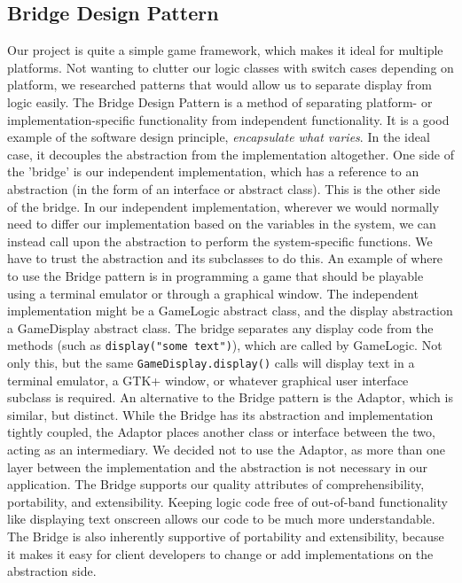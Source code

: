 \documentclass[11pt]{report}
\begin{document}
	\subsection{Bridge Design Pattern}
	Our project is quite a simple game framework, which makes it ideal for multiple platforms. Not wanting to clutter our logic classes with switch cases depending on platform, we researched patterns that would allow us to separate display from logic easily. The Bridge Design Pattern is a method of separating platform- or implementation-specific functionality from independent functionality. It is a good example of the software design principle, \emph{encapsulate what varies}. In the ideal case, it decouples the abstraction from the implementation altogether. One side of the 'bridge' is our independent implementation, which has a reference to an abstraction (in the form of an interface or abstract class). This is the other side of the bridge. In our independent implementation, wherever we would normally need to differ our implementation based on the variables in the system, we can instead call upon the abstraction to perform the system-specific functions. We have to trust the abstraction and its subclasses to do this. An example of where to use the Bridge pattern is in programming a game that should be playable using a terminal emulator or through a graphical window. The independent implementation might be a GameLogic abstract class, and the display abstraction a GameDisplay abstract class. The bridge separates any display code from the methods (such as \texttt{display("some text")}), which are called by GameLogic. Not only this, but the same \texttt{GameDisplay.display()} calls will display text in a terminal emulator, a GTK+ window, or whatever graphical user interface subclass is required. An alternative to the Bridge pattern is the Adaptor, which is similar, but distinct. While the Bridge has its abstraction and implementation tightly coupled, the Adaptor places another class or interface between the two, acting as an intermediary. We decided not to use the Adaptor, as more than one layer between the implementation and the abstraction is not necessary in our application. The Bridge supports our quality attributes of comprehensibility, portability, and extensibility. Keeping logic code free of out-of-band functionality like displaying text onscreen allows our code to be much more understandable. The Bridge is also inherently supportive of portability and extensibility, because it makes it easy for client developers to change or add implementations on the abstraction side.
	
\end{document}
